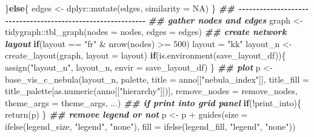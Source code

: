 \documentclass[
]{article}
\newenvironment{Shaded}{\begin{snugshade}}{\end{snugshade}}
\newcommand{\AttributeTok}[1]{\textcolor[rgb]{0.77,0.63,0.00}{#1}}
\newcommand{\ConstantTok}[1]{\textcolor[rgb]{0.00,0.00,0.00}{#1}}
\newcommand{\ControlFlowTok}[1]{\textcolor[rgb]{0.13,0.29,0.53}{\textbf{#1}}}
\newcommand{\DecValTok}[1]{\textcolor[rgb]{0.00,0.00,0.81}{#1}}
\newcommand{\DocumentationTok}[1]{\textcolor[rgb]{0.56,0.35,0.01}{\textbf{\textit{#1}}}}
\newcommand{\FunctionTok}[1]{\textcolor[rgb]{0.00,0.00,0.00}{#1}}
\newcommand{\NormalTok}[1]{#1}
\newcommand{\OtherTok}[1]{\textcolor[rgb]{0.56,0.35,0.01}{#1}}
\newcommand{\SpecialCharTok}[1]{\textcolor[rgb]{0.00,0.00,0.00}{#1}}
\newcommand{\StringTok}[1]{\textcolor[rgb]{0.31,0.60,0.02}{#1}}
\begin{document}
\begin{Shaded}
\begin{Highlighting}[]
\NormalTok{    \}}\ControlFlowTok{else}\NormalTok{\{}
\NormalTok{      edges }\OtherTok{\textless{}{-}}\NormalTok{ dplyr}\SpecialCharTok{::}\FunctionTok{mutate}\NormalTok{(edges, }\AttributeTok{similarity =} \ConstantTok{NA}\NormalTok{) }
\NormalTok{    \}}
    \DocumentationTok{\#\# {-}{-}{-}{-}{-}{-}{-}{-}{-}{-}{-}{-}{-}{-}{-}{-}{-}{-}{-}{-}{-}{-}{-}{-}{-}{-}{-}{-}{-}{-}{-}{-}{-}{-}{-}{-}{-}{-}{-}{-}{-}{-}{-}{-}{-}{-}{-}{-}{-}{-}{-}{-}{-}{-}{-}{-}{-}{-}{-}{-}}
    \DocumentationTok{\#\# gather nodes and edges}
\NormalTok{    graph }\OtherTok{\textless{}{-}}\NormalTok{ tidygraph}\SpecialCharTok{::}\FunctionTok{tbl\_graph}\NormalTok{(}\AttributeTok{nodes =}\NormalTok{ nodes, }\AttributeTok{edges =}\NormalTok{ edges)}
    \DocumentationTok{\#\# create network layout}
    \ControlFlowTok{if}\NormalTok{(layout }\SpecialCharTok{==} \StringTok{"fr"} \SpecialCharTok{\&} \FunctionTok{nrow}\NormalTok{(nodes) }\SpecialCharTok{\textgreater{}=} \DecValTok{500}\NormalTok{)}
\NormalTok{      layout }\OtherTok{=} \StringTok{"kk"}
\NormalTok{    layout\_n }\OtherTok{\textless{}{-}} \FunctionTok{create\_layout}\NormalTok{(graph, }\AttributeTok{layout =}\NormalTok{ layout)}
    \ControlFlowTok{if}\NormalTok{(}\FunctionTok{is.environment}\NormalTok{(save\_layout\_df))\{}
      \FunctionTok{assign}\NormalTok{(}\StringTok{"layout\_n"}\NormalTok{, layout\_n, }\AttributeTok{envir =}\NormalTok{ save\_layout\_df)}
\NormalTok{    \}}
    \DocumentationTok{\#\# plot}
\NormalTok{    p }\OtherTok{\textless{}{-}} \FunctionTok{base\_vis\_c\_nebula}\NormalTok{(layout\_n, palette,}
                           \AttributeTok{title =}\NormalTok{ anno[[}\StringTok{"nebula\_index"}\NormalTok{]],}
                           \AttributeTok{title\_fill =}\NormalTok{ title\_palette[}\FunctionTok{as.numeric}\NormalTok{(anno[[}\StringTok{"hierarchy"}\NormalTok{]])],}
                           \AttributeTok{remove\_nodes =}\NormalTok{ remove\_nodes,}
                           \AttributeTok{theme\_args =}\NormalTok{ theme\_args,}
\NormalTok{                           ...)}
    \DocumentationTok{\#\# if print into grid panel}
    \ControlFlowTok{if}\NormalTok{(}\SpecialCharTok{!}\NormalTok{print\_into)\{}
      \FunctionTok{return}\NormalTok{(p)}
\NormalTok{    \}}
    \DocumentationTok{\#\# remove legend or not}
\NormalTok{    p }\OtherTok{\textless{}{-}}\NormalTok{ p }\SpecialCharTok{+} \FunctionTok{guides}\NormalTok{(}\AttributeTok{size =} \FunctionTok{ifelse}\NormalTok{(legend\_size, }\StringTok{"legend"}\NormalTok{, }\StringTok{"none"}\NormalTok{),}
                             \AttributeTok{fill =} \FunctionTok{ifelse}\NormalTok{(legend\_fill, }\StringTok{"legend"}\NormalTok{, }\StringTok{"none"}\NormalTok{))}

\end{Highlighting}
\end{Shaded}
\end{document}
